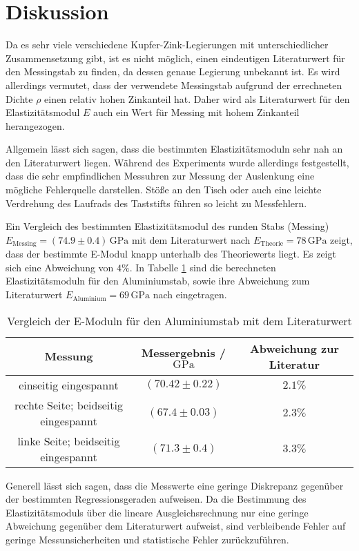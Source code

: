 \section{Diskussion}
\label{sec:Diskussion}
Da es sehr viele verschiedene Kupfer-Zink-Legierungen mit unterschiedlicher Zusammensetzung gibt, ist es nicht möglich, einen eindeutigen Literaturwert für den Messingstab zu finden, da dessen genaue Legierung unbekannt ist.
Es wird allerdings vermutet, dass der verwendete Messingstab aufgrund der errechneten Dichte $\rho$ einen relativ hohen Zinkanteil hat.
Daher wird als Literaturwert für den Elastizitätsmodul $E$ auch ein Wert für Messing mit hohem Zinkanteil herangezogen.

Allgemein lässt sich sagen, dass die bestimmten Elastizitätsmoduln sehr nah an den Literaturwert liegen.
Während des Experiments wurde allerdings festgestellt, dass die sehr empfindlichen Messuhren zur Messung der Auslenkung eine mögliche Fehlerquelle darstellen.
Stöße an den Tisch oder auch eine leichte Verdrehung des Laufrads des Taststifts führen so leicht zu Messfehlern.

Ein Vergleich des bestimmten Elastizitätsmodul des runden Stabs (Messing) $E_{\mathrm{Messing}}= (74.9 \pm 0.4)\,\si{\giga\pascal}$ mit dem Literaturwert nach \cite{Hans}
$E_{\mathrm{Theorie}}=78\, \si{\giga\pascal}$ zeigt, dass der bestimmte E-Modul knapp unterhalb des Theoriewerts liegt. Es zeigt sich eine Abweichung von $4\%$.
In Tabelle \ref{tab:messergebnisse} sind die berechneten Elastizitätsmoduln für den Aluminiumstab, sowie ihre Abweichung zum Literaturwert $E_{\mathrm{Aluminium}}= 69\, \si{\giga\pascal}$ nach \cite{Hans} eingetragen.

\begin{table}
	\centering
	\caption{Vergleich der E-Moduln für den Aluminiumstab mit dem Literaturwert}
	\label{tab:messergebnisse}
	\begin{tabular}{ccc}
		\toprule
		Messung                              & Messergebnis /$\si{\giga\pascal}$ & Abweichung zur Literatur \\
		\midrule
		einseitig eingespannt                & $(70.42 \pm 0.22)$                & $2.1\%$                \\
		rechte Seite; beidseitig eingespannt & $(67.4 \pm 0.03)$                 & $2.3\%$                \\
		linke Seite; beidseitig eingespannt  & $(71.3 \pm 0.4)$                  & $3.3\%$                \\
		\bottomrule
	\end{tabular}
\end{table}

Generell lässt sich sagen, dass die Messwerte eine geringe Diskrepanz 
gegenüber der bestimmten Regressionsgeraden aufweisen.
Da die Bestimmung des Elastizitätsmoduls über die lineare 
Ausgleichsrechnung nur eine geringe Abweichung gegenüber dem Literaturwert 
aufweist, sind verbleibende Fehler auf geringe Messunsicherheiten und 
statistische Fehler zurückzuführen.
